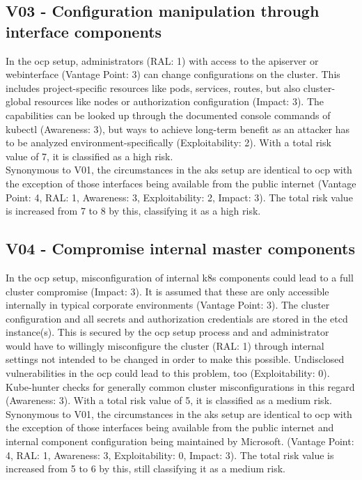 \subsection{V03 - Configuration manipulation through interface components}

In the \gls{ocp} setup, administrators (RAL: 1) with access to the apiserver or webinterface (Vantage Point: 3) can change configurations on the cluster. This includes project-specific resources like pods, services, routes, but also cluster-global resources like nodes or authorization configuration (Impact: 3).
The capabilities can be looked up through the documented console commands of kubectl (Awareness: 3), but ways to achieve long-term benefit as an attacker has to be analyzed environment-specifically (Exploitability: 2).
With a total risk value of 7, it is classified as a high risk. \\
Synonymous to V01, the circumstances in the \gls{aks} setup are identical to \gls{ocp} with the exception of those interfaces being available from the public internet (Vantage Point: 4, RAL: 1, Awareness: 3, Exploitability: 2, Impact: 3). 
The total risk value is increased from 7 to 8 by this, classifying it as a high risk.

\subsection{V04 - Compromise internal master components}

In the \gls{ocp} setup, misconfiguration of internal \gls{k8s} components could lead to a full cluster compromise (Impact: 3).  It is assumed that these are only accessible internally in typical corporate environments (Vantage Point: 3). The cluster configuration and all secrets and authorization credentials are stored in the etcd instance(s). This is secured by the \gls{ocp} setup process and and administrator would have to willingly misconfigure the cluster (RAL: 1) through internal settings not intended to be changed in order to make this possible. Undisclosed vulnerabilities in the \gls{ocp} could lead to this problem, too (Exploitability: 0).
Kube-hunter checks for generally common cluster misconfigurations in this regard (Awareness: 3).
With a total risk value of 5, it is classified as a medium risk. \\
Synonymous to V01, the circumstances in the \gls{aks} setup are identical to \gls{ocp} with the exception of those interfaces being available from the public internet and internal component configuration being maintained by Microsoft. (Vantage Point: 4, RAL: 1, Awareness: 3, Exploitability: 0, Impact: 3). 
The total risk value is increased from 5 to 6 by this, still classifying it as a medium risk.

